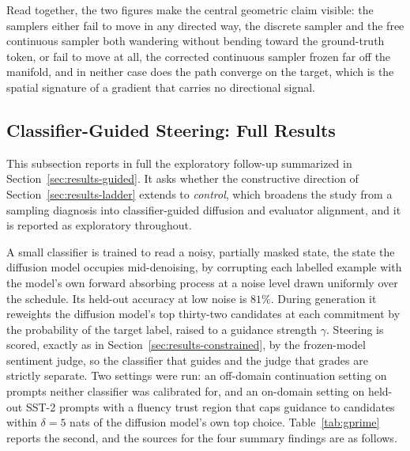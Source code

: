 Read together, the two figures make the central geometric claim visible: the samplers either fail to move in any directed way, the discrete sampler and the free continuous sampler both wandering without bending toward the ground-truth token, or fail to move at all, the corrected continuous sampler frozen far off the manifold, and in neither case does the path converge on the target, which is the spatial signature of a gradient that carries no directional signal.

\subsection{Classifier-Guided Steering: Full Results}
\label{app:guided}


This subsection reports in full the exploratory follow-up summarized in
Section~\ref{sec:results-guided}. It asks whether the constructive direction of
Section~\ref{sec:results-ladder} extends to \emph{control}, which broadens the study from a
sampling diagnosis into classifier-guided diffusion and evaluator alignment, and it is
reported as exploratory throughout.

A small classifier is trained to read a noisy, partially masked state, the state the diffusion model occupies mid-denoising, by corrupting each labelled example with the model's own forward absorbing process at a noise level drawn uniformly over the schedule. Its held-out accuracy at low noise is $81\%$.
During generation it reweights the diffusion model's top thirty-two candidates at each commitment by the probability of the target label, raised to a guidance strength $\gamma$. Steering is scored, exactly as in Section~\ref{sec:results-constrained}, by the frozen-model sentiment judge, so the classifier that guides and the judge that grades are strictly separate. Two settings were run: an off-domain continuation setting on prompts neither classifier was calibrated for, and an on-domain setting on held-out SST-2 prompts with a fluency trust region that caps guidance to candidates within $\delta=5$ nats of the diffusion model's own top choice. Table~\ref{tab:gprime} reports the second, and the sources for the four summary findings are as follows.

